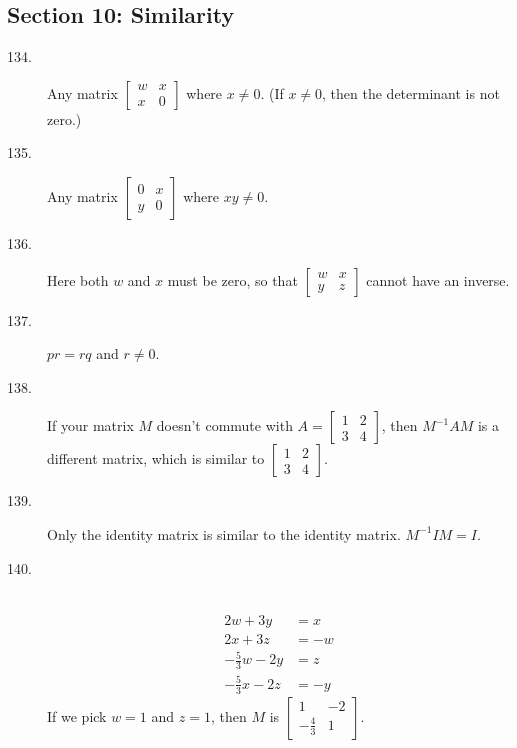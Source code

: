 \documentclass{article}
\begin{document}
\subsection*{Section 10: Similarity}

\begin{description}

  \item[134.] Any matrix $\begin{bmatrix} w & x \\ x & 0 \end{bmatrix}$ where $x \neq 0$. (If $x \neq 0$, then the determinant is not zero.)

  \item[135.] Any matrix $\begin{bmatrix} 0 & x \\ y & 0 \end{bmatrix}$ where $xy \neq 0$.

  \item[136.] Here both $w$ and $x$ must be zero, so that $\begin{bmatrix} w & x \\ y & z \end{bmatrix}$ cannot have an inverse.

  \item[137.] $pr = rq$ and $r \neq 0$.

  \item[138.] If your matrix $M$ doesn't commute with $A = \begin{bmatrix} 1 & 2 \\ 3 & 4 \end{bmatrix}$, then $M^{-1} AM$ is a different matrix, which is similar to $\begin{bmatrix} 1 & 2 \\ 3 & 4 \end{bmatrix}$.

  \item[139.] Only the identity matrix is similar to the identity matrix. $M^{-1} IM = I$.

  \item[140.] $\ $
    \begin{align*}
        2w + 3y       & =  x \\
        2x + 3z       & = -w \\
    -\frac{5}{3} w-2y & =  z \\
    -\frac{5}{3} x-2z & = -y
    \end{align*}
    If we pick $w=1$ and $z=1$, then $M$ is $\begin{bmatrix} 1 & -2 \\ -\frac{4}{3} & 1 \end{bmatrix}$.


\end{description}
\end{document}
